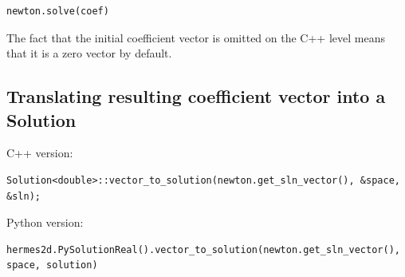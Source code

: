 \documentclass{article}
\begin{document}
{\small
\begin{verbatim}
newton.solve(coef)
\end{verbatim}
}
\noindent
The fact that the initial coefficient vector {\tt} is omitted on the 
C++ level means that it is a zero vector by default. 

\subsection*{Translating resulting coefficient vector into a Solution}

C++ version:

{\small
\begin{verbatim}
Solution<double>::vector_to_solution(newton.get_sln_vector(), &space, &sln);
\end{verbatim}
}
\noindent
Python version:

{\small
\begin{verbatim}
hermes2d.PySolutionReal().vector_to_solution(newton.get_sln_vector(), space, solution)
\end{verbatim}
}












{\small
\begin{verbatim}


\end{verbatim}
}




{\small
\begin{verbatim}


\end{verbatim}
}




{\small
\begin{verbatim}


\end{verbatim}
}




{\small
\begin{verbatim}


\end{verbatim}
}




{\small
\begin{verbatim}


\end{verbatim}
}




{\small
\begin{verbatim}


\end{verbatim}
}




{\small
\begin{verbatim}


\end{verbatim}
}




{\small
\begin{verbatim}


\end{verbatim}
}




{\small
\begin{verbatim}


\end{verbatim}
}
\end{document}
